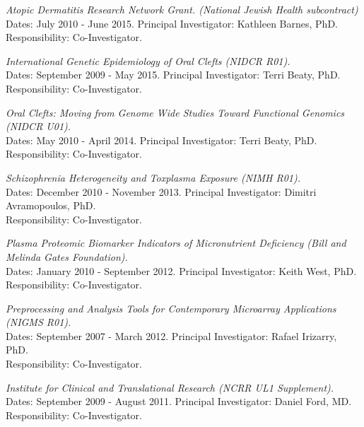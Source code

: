 \documentclass[10pt]{article}
\newcommand{\dn}[1]{{\color{black} {#1}}}
\begin{document}
\item
{\it Atopic Dermatitis Research Network Grant. (National Jewish Health subcontract)}\\[0.0em]
\dn{Dates:} July 2010 - June 2015.
\dn{Principal Investigator:} Kathleen Barnes, PhD.\\
\dn{Responsibility:} Co-Investigator.

\item
{\it International Genetic Epidemiology of Oral Clefts (NIDCR R01).}\\[0.0em]
\dn{Dates:} September 2009 - May 2015.
\dn{Principal Investigator:} Terri Beaty, PhD.\\
\dn{Responsibility:} Co-Investigator.

\item
{\it Oral Clefts: Moving from Genome Wide Studies Toward Functional Genomics (NIDCR U01).}\\[0.0em]
\dn{Dates:} May 2010 - April 2014.
\dn{Principal Investigator:} Terri Beaty, PhD.\\
\dn{Responsibility:} Co-Investigator.

\item
{\it Schizophrenia Heterogeneity and Toxplasma Exposure (NIMH R01).}\\[0.0em]
\dn{Dates:} December 2010 - November 2013.
\dn{Principal Investigator:} Dimitri Avramopoulos, PhD.\\
\dn{Responsibility:} Co-Investigator.

\item
{\it Plasma Proteomic Biomarker Indicators of Micronutrient Deficiency (Bill and Melinda Gates Foundation).}\\[0.0em]
\dn{Dates:} January 2010 - September 2012.
\dn{Principal Investigator:} Keith West, PhD.\\
\dn{Responsibility:} Co-Investigator.

\item
{\it Preprocessing and Analysis Tools for Contemporary Microarray Applications (NIGMS R01).}\\[0.0em]
\dn{Dates:} September 2007 - March 2012.
\dn{Principal Investigator:} Rafael Irizarry, PhD.\\
\dn{Responsibility:} Co-Investigator.

\item
{\it Institute for Clinical and Translational Research (NCRR UL1 Supplement).}\\[0.0em]
\dn{Dates:} September 2009 - August 2011.
\dn{Principal Investigator:} Daniel Ford, MD.\\
\dn{Responsibility:} Co-Investigator.
\end{document}
